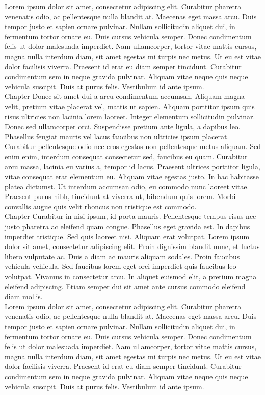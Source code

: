 %
Lorem ipsum dolor sit amet, consectetur adipiscing elit. Curabitur pharetra venenatis odio, ac pellentesque nulla blandit at. Maecenas eget massa arcu. Duis tempor justo et sapien ornare pulvinar. Nullam sollicitudin aliquet dui, in fermentum tortor ornare eu. Duis cursus vehicula semper. Donec condimentum felis ut dolor malesuada imperdiet. Nam ullamcorper, tortor vitae mattis cursus, magna nulla interdum diam, sit amet egestas mi turpis nec metus. Ut eu est vitae dolor facilisis viverra. Praesent id erat eu diam semper tincidunt. Curabitur condimentum sem in neque gravida pulvinar. Aliquam vitae neque quis neque vehicula suscipit. Duis at purus felis. Vestibulum id ante ipsum. \\

Chapter Donec sit amet dui a arcu condimentum accumsan. Aliquam magna velit, pretium vitae placerat vel, mattis ut sapien. Aliquam porttitor ipsum quis risus ultricies non lacinia lorem laoreet. Integer elementum sollicitudin pulvinar. Donec sed ullamcorper orci. Suspendisse pretium ante ligula, a dapibus leo. Phasellus feugiat mauris vel lacus faucibus non ultricies ipsum placerat. Curabitur pellentesque odio nec eros egestas non pellentesque metus aliquam. Sed enim enim, interdum consequat consectetur sed, faucibus eu quam. Curabitur arcu massa, lacinia eu varius a, tempor id lacus. Praesent ultrices porttitor ligula, vitae consequat erat elementum eu. Aliquam vitae egestas justo. In hac habitasse platea dictumst. Ut interdum accumsan odio, eu commodo nunc laoreet vitae. Praesent purus nibh, tincidunt at viverra ut, bibendum quis lorem. Morbi convallis augue quis velit rhoncus non tristique est commodo. \\

Chapter Curabitur in nisi ipsum, id porta mauris. Pellentesque tempus risus nec justo pharetra ac eleifend quam congue. Phasellus eget gravida est. In dapibus imperdiet tristique. Sed quis laoreet nisi. Aliquam erat volutpat. Lorem ipsum dolor sit amet, consectetur adipiscing elit. Proin dignissim blandit nunc, et luctus libero vulputate ac. Duis a diam ac mauris aliquam sodales. Proin faucibus vehicula vehicula. Sed faucibus lorem eget orci imperdiet quis faucibus leo volutpat. Vivamus in consectetur arcu. In aliquet euismod elit, a pretium magna eleifend adipiscing. Etiam semper dui sit amet ante cursus commodo eleifend diam mollis. \\

Lorem ipsum dolor sit amet, consectetur adipiscing elit. Curabitur pharetra venenatis odio, ac pellentesque nulla blandit at. Maecenas eget massa arcu. Duis tempor justo et sapien ornare pulvinar. Nullam sollicitudin aliquet dui, in fermentum tortor ornare eu. Duis cursus vehicula semper. Donec condimentum felis ut dolor malesuada imperdiet. Nam ullamcorper, tortor vitae mattis cursus, magna nulla interdum diam, sit amet egestas mi turpis nec metus. Ut eu est vitae dolor facilisis viverra. Praesent id erat eu diam semper tincidunt. Curabitur condimentum sem in neque gravida pulvinar. Aliquam vitae neque quis neque vehicula suscipit. Duis at purus felis. Vestibulum id ante ipsum. \\

